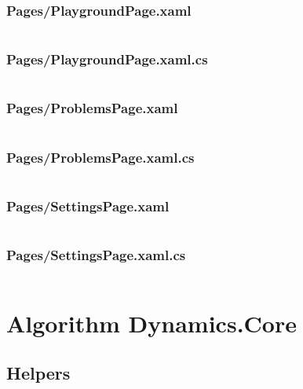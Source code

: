 \documentclass[a4paper]{report}
\begin{document}
\inputminted{csharp}{"../src/Algorithm Dynamics/Pages/HomePage.xaml.cs"}

\subsubsection{Pages/PlaygroundPage.xaml}

\inputminted{xml}{"../src/Algorithm Dynamics/Pages/PlaygroundPage.xaml"}

\subsubsection{Pages/PlaygroundPage.xaml.cs}

\inputminted{csharp}{"../src/Algorithm Dynamics/Pages/PlaygroundPage.xaml.cs"}

\subsubsection{Pages/ProblemsPage.xaml}
\label{subsubsec:problemspage}

\inputminted{xml}{"../src/Algorithm Dynamics/Pages/ProblemsPage.xaml"}

\subsubsection{Pages/ProblemsPage.xaml.cs}

\inputminted{csharp}{"../src/Algorithm Dynamics/Pages/ProblemsPage.xaml.cs"}

\subsubsection{Pages/SettingsPage.xaml}

\inputminted{xml}{"../src/Algorithm Dynamics/Pages/SettingsPage.xaml"}

\subsubsection{Pages/SettingsPage.xaml.cs}

\inputminted{csharp}{"../src/Algorithm Dynamics/Pages/SettingsPage.xaml.cs"}

\section{Algorithm Dynamics.Core}

\subsection{Helpers}
\end{document}
